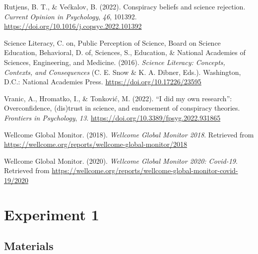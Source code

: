 \documentclass[
  doc,floatsintext]{apa6}
\newlength{\cslhangindent}
\newenvironment{CSLReferences}[2] %
 {\begin{list}{}{%
  \setlength{\itemindent}{0pt}
  \setlength{\leftmargin}{0pt}
  \setlength{\parsep}{0pt}
  \ifodd #1
   \setlength{\leftmargin}{\cslhangindent}
   \setlength{\itemindent}{-1\cslhangindent}
  \fi
  \setlength{\itemsep}{#2\baselineskip}}}
 {\end{list}}
\begin{document}
\begin{CSLReferences}{1}{0}
Rutjens, B. T., \& Većkalov, B. (2022). Conspiracy beliefs and science rejection. \emph{Current Opinion in Psychology}, \emph{46}, 101392. \url{https://doi.org/10.1016/j.copsyc.2022.101392}

Science Literacy, C. on, Public Perception of Science, Board on Science Education, Behavioral, D. of, Sciences, S., Education, \& National Academies of Sciences, Engineering, and Medicine. (2016). \emph{Science Literacy: Concepts, Contexts, and Consequences} (C. E. Snow \& K. A. Dibner, Eds.). Washington, D.C.: National Academies Press. \url{https://doi.org/10.17226/23595}

Vranic, A., Hromatko, I., \& Tonković, M. (2022). {``}I did my own research{''}: Overconfidence, (dis)trust in science, and endorsement of conspiracy theories. \emph{Frontiers in Psychology}, \emph{13}. \url{https://doi.org/10.3389/fpsyg.2022.931865}

Wellcome Global Monitor. (2018). \emph{Wellcome Global Monitor 2018}. Retrieved from \url{https://wellcome.org/reports/wellcome-global-monitor/2018}

Wellcome Global Monitor. (2020). \emph{Wellcome Global Monitor 2020: Covid-19}. Retrieved from \url{https://wellcome.org/reports/wellcome-global-monitor-covid-19/2020}

\end{CSLReferences}

\newpage

\appendix


\section{Experiment 1}\label{exp1}

\subsection{Materials}\label{materials-3}

\FloatBarrier
\end{document}

